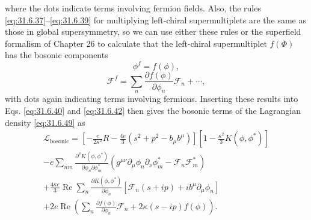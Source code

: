where the dots indicate terms involving fermion fields. Also, the rules
\eqref{eq:31.6.37}--\eqref{eq:31.6.39} for multiplying left-chiral
supermultiplets are the same as those in global supersymmetry, so we can
use either these rules or the superfield formalism of Chapter 26 to
calculate that the left-chiral supermultiplet \(f(\Phi)\) has the
bosonic components
\begin{equation}
  \phi^f=f(\phi),
  \tag{31.6.55}\label{eq:31.6.55}
\end{equation}
\begin{equation}
  \mathcal F^f
  =\sum_n\frac{\partial f(\phi)}{\partial\phi_n}\mathcal F_n+\cdots,
  \tag{31.6.56}\label{eq:31.6.56}
\end{equation}
with dots again indicating terms involving fermions. Inserting these
results into Eqs. \eqref{eq:31.6.40} and \eqref{eq:31.6.42} then gives
the bosonic terms of the Lagrangian density \eqref{eq:31.6.49} as
\begin{multline}
  \mathcal L_{\mathrm{bosonic}}
  =\left[
    -\frac{e}{2\kappa^2}R
    -\frac{4e}{3}(s^2+p^2-b_\mu b^\mu)
  \right]
  \left[1-\frac{\kappa^2}{3}K(\phi,\phi^*)\right]\\
  -e\sum_{nm}
    \frac{\partial^2K(\phi,\phi^*)}
         {\partial\phi_n\partial\phi_m^*}
    \left(
      g^{\mu\nu}\partial_\mu\phi_n\partial_\nu\phi_m^*
      -\mathcal F_n\mathcal F_m^*
    \right)\\
  +\frac{4\kappa e}{3}\operatorname{Re}\sum_n
    \frac{\partial K(\phi,\phi^*)}{\partial\phi_n}
    \left[
      \mathcal F_n(s+ip)+ib^\mu\partial_\mu\phi_n
    \right]\\
  +2e\operatorname{Re}\left(
    \sum_n\frac{\partial f(\phi)}{\partial\phi_n}\mathcal F_n
    +2\kappa(s-ip)f(\phi)
  \right).
  \tag{31.6.57}\label{eq:31.6.57}
\end{multline}

